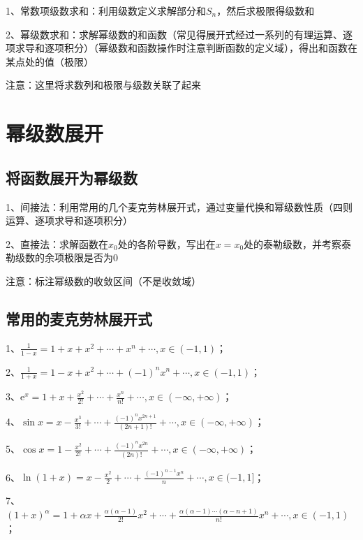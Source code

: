 1、常数项级数求和：利用级数定义求解部分和$S_n$，然后求极限得级数和

2、幂级数求和：求解幂级数的和函数（常见得展开式经过一系列的有理运算、逐项求导和逐项积分）（幂级数和函数操作时注意判断函数的定义域），得出和函数在某点处的值（极限）

注意：这里将求数列和极限与级数关联了起来

\section{幂级数展开}



\subsection{将函数展开为幂级数}

1、间接法：利用常用的几个麦克劳林展开式，通过变量代换和幂级数性质（四则运算、逐项求导和逐项积分）

2、直接法：求解函数在$x_0$处的各阶导数，写出在$x=x_0$处的泰勒级数，并考察泰勒级数的余项极限是否为0

注意：标注幂级数的收敛区间（不是收敛域）



\subsection{常用的麦克劳林展开式}

1、$\frac{1}{1-x}=1+x+x^{2}+\cdots+x^{n}+\cdots, x \in(-1,1)$；

2、$\frac{1}{1+x}=1-x+x^{2}+\cdots+(-1)^{n} x^{n}+\cdots, x \in(-1,1)$；

3、$\mathrm{e}^{x}=1+x+\frac{x^{2}}{2 !}+\cdots+\frac{x^{n}}{n !}+\cdots, x \in(-\infty,+\infty)$；

4、$\sin x=x-\frac{x^{3}}{3 !}+\cdots+\frac{(-1)^{n} x^{2 n+1}}{(2 n+1) !}+\cdots, x \in(-\infty,+\infty)$；

5、$\cos x=1-\frac{x^{2}}{2 !}+\cdots+\frac{(-1)^{n} x^{2 n}}{(2 n) !}+\cdots, x \in(-\infty,+\infty)$；

6、$\ln (1+x)=x-\frac{x^{2}}{2}+\cdots+\frac{(-1)^{n-1} x^{n}}{n}+\cdots, x \in(-1,1]$；

7、$(1+x)^{\alpha}=1+\alpha x+\frac{\alpha(\alpha-1)}{2 !} x^{2}+\cdots+\frac{\alpha(\alpha-1) \cdots(\alpha-n+1)}{n !} x^{n}+\cdots, x \in(-1,1)$；

